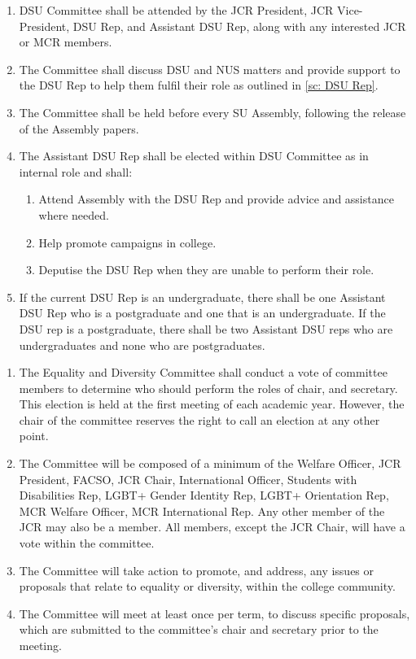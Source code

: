 \begin{enumerate}
    \item DSU Committee shall be attended by the JCR President, JCR Vice-President, DSU Rep, and Assistant DSU Rep, along with any interested JCR or MCR members.
    \item The Committee shall discuss DSU and NUS matters and provide support to the DSU Rep to help them fulfil their role as outlined in \ref{sc: DSU Rep}.
    \item The Committee shall be held before every SU Assembly, following the release of the Assembly papers.
    \item The Assistant DSU Rep shall be elected within DSU Committee as in internal role and shall:
    \begin{enumerate}
        \item Attend Assembly with the DSU Rep and provide advice and assistance where needed. 
        \item Help promote campaigns in college.
        \item Deputise the DSU Rep when they are unable to perform their role.
    \end{enumerate}
    \item If the current DSU Rep is an undergraduate, there shall be one Assistant DSU Rep who is a postgraduate and one that is an undergraduate. If the DSU rep is a postgraduate, there shall be two Assistant DSU reps who are undergraduates and none who are postgraduates.
\end{enumerate}



\begin{enumerate}

    \item The Equality and Diversity Committee shall conduct a vote of committee members to determine who should perform the roles of chair, and secretary. This election is held at the first meeting of each academic year. However, the chair of the committee reserves the right to call an election at any other point.
    \item The Committee will be composed of a minimum of the Welfare Officer, JCR President, FACSO, JCR Chair, International Officer, Students with Disabilities Rep, LGBT+ Gender Identity Rep, LGBT+ Orientation Rep, MCR Welfare Officer, MCR International Rep. Any other member of the JCR may also be a member. All members, except the JCR Chair, will have a vote within the committee.
    \item The Committee will take action to promote, and address, any issues or proposals that relate to equality or diversity, within the college community.
    \item The Committee will meet at least once per term, to discuss specific proposals, which are submitted to the committee’s chair and secretary prior to the meeting.
\end{enumerate}


